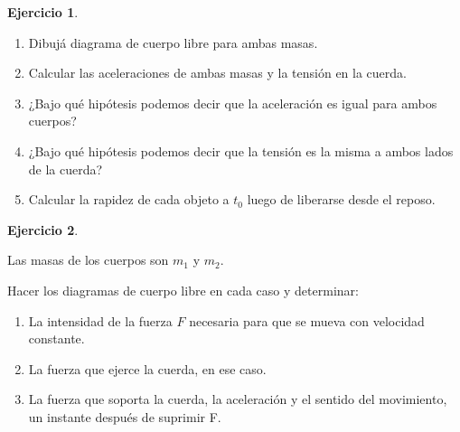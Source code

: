 \documentclass[a4paper,12pt,twoside]{book}
\newtheorem{ejercicio}{{Ejercicio}}[chapter]
\begin{document}
\begin{mdframed}[style=ejercicio-facil] %
    \begin{ejercicio}
    \end{ejercicio}
    \begin{enumerate}
        \item Dibujá diagrama de cuerpo libre para ambas masas.
        \item Calcular las aceleraciones de ambas masas y la tensión en la cuerda. 
        \item ¿Bajo qué hipótesis podemos decir que la aceleración es igual para ambos cuerpos?
        \item ¿Bajo qué hipótesis podemos decir que la tensión es la misma a ambos lados de la cuerda? 
        \item Calcular la rapidez de cada objeto a $t_0$ luego de liberarse desde el reposo.     
    \end{enumerate}
\end{mdframed}

\begin{mdframed}[style=ejercicio-facil]
    \begin{ejercicio}
    \end{ejercicio}
    Las masas de los cuerpos son $m_1$ y $m_2$.
    \begin{center}
        \def\svgwidth{0.5\linewidth}
        
    \end{center}
    
    Hacer los diagramas de cuerpo libre en cada caso y determinar:
    \begin{enumerate}
        \item La intensidad de la fuerza $F$ necesaria para que se mueva con velocidad constante.
        \item La fuerza que ejerce la cuerda, en ese caso.
        \item La fuerza que soporta la cuerda, la aceleración y el sentido del movimiento, un instante después de suprimir F.
    \end{enumerate}
\end{mdframed}
\end{document}
